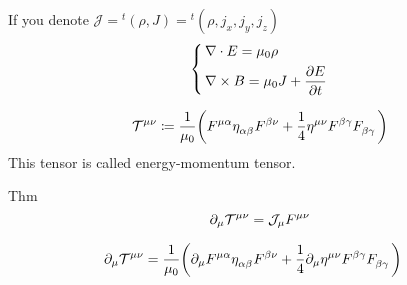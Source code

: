 \documentclass[leqno]{ltjsarticle}
\begin{document}
	\begin{shadebox}
		If you denote $\mathcal J = {}^t(\rho,J) = {}^t(\rho,j_x,j_y,j_z)$
		\begin{equation}
			\left\{\,
				\begin{aligned}
					&\nabla\cdot E = \mu_0\rho\\
					&\nabla\times B = \mu_0J + \pdv{E}{t}
				\end{aligned}
			\right.
		\end{equation}
	\end{shadebox}
	\begin{equation}
		\tensor{\mathcal T}{^\mu^\nu} \coloneq \frac{1}{\mu_0}\qty(\tensor{F}{^\mu^\alpha}\tensor{\eta}{_\alpha_\beta}\tensor{F}{^\beta^\nu} + \frac{1}{4}\tensor{\eta}{^\mu^\nu}\tensor{F}{^\beta^\gamma}\tensor{F}{_\beta_\gamma}) 
	\end{equation}
		This tensor is called energy-momentum tensor.
	\begin{itembox}[l]{Thm}
		\begin{equation}
			\partial_\mu \tensor{\mathcal T}{^\mu^\nu} = \mathcal J_{\mu}\tensor{F}{^\mu^\nu}
		\end{equation}
	\end{itembox}
	\begin{align*}
		\partial_\mu \tensor{\mathcal T}{^\mu^\nu}&= \frac{1}{\mu_0}\qty(\partial_{\mu}\tensor{F}{^\mu^\alpha}\tensor{\eta}{_\alpha_\beta}\tensor{F}{^\beta^\nu} + \frac{1}{4}\partial_{\mu}\tensor{\eta}{^\mu^\nu}\tensor{F}{^\beta^\gamma}\tensor{F}{_\beta_\gamma})
	\end{align*}
\end{document}
